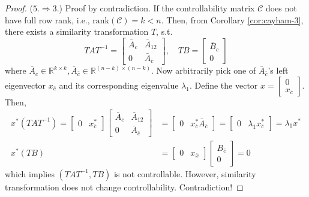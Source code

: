 \documentclass[
]{book}
\theoremstyle{definition}
\theoremstyle{definition}
\theoremstyle{definition}
\theoremstyle{definition}
\theoremstyle{remark}
\begin{document}
\begin{proof}
(\(5. \Rightarrow 3.\)) Proof by contradiction. If the controllability matrix \(\mathcal{C}\) does not have full row rank, i.e., \(\text{rank}(\mathcal{C}) = k < n\). Then, from Corollary \ref{cor:cayham-3}, there exists a similarity transformation \(T\), s.t.
\begin{equation*}
   TAT^{-1} = \begin{bmatrix}
      \bar{A}_{c} & \bar{A}_{12} \\
      0 & \bar{A}_{\bar{c}}
   \end{bmatrix}, \quad TB = \begin{bmatrix}
      \bar{B}_c \\ 0
   \end{bmatrix}
\end{equation*}
where \(\bar{A}_c \in \mathbb{R}^{k \times k}, \bar{A}_{\bar{c}} \in \mathbb{R}^{(n-k) \times (n-k)}\). Now arbitrarily pick one of \(\bar{A}_{\bar{c}}\)'s left eigenvector \(x_{\bar{c}}\) and its corresponding eigenvalue \(\lambda_1\). Define the vector \(x = \begin{bmatrix}
   0 \\ x_{\bar{c}}
\end{bmatrix}\). Then,
\begin{equation*}
   \begin{split}
      x^* (TAT^{-1}) = \begin{bmatrix}
         0 & x_{\bar{c}}^*
      \end{bmatrix} \begin{bmatrix}
         \bar{A}_{c} & \bar{A}_{12} \\
         0 & \bar{A}_{\bar{c}}
      \end{bmatrix} & = \begin{bmatrix}
         0 & x_{\bar{c}}^* \bar{A}_{\bar{c}}
      \end{bmatrix} = \begin{bmatrix}
         0 & \lambda_1 x_{\bar{c}}^*
      \end{bmatrix} = \lambda_1 x^* \\
      x^* (TB) & = \begin{bmatrix}
         0 & x_{\bar{x}}
      \end{bmatrix} \begin{bmatrix}
         B_{\bar{c}} \\ 0
      \end{bmatrix} = 0
   \end{split}
\end{equation*}
which implies \((TAT^{-1}, TB)\) is not controllable. However, similarity transformation does not change controllability. Contradiction!


\end{proof}
\end{document}
